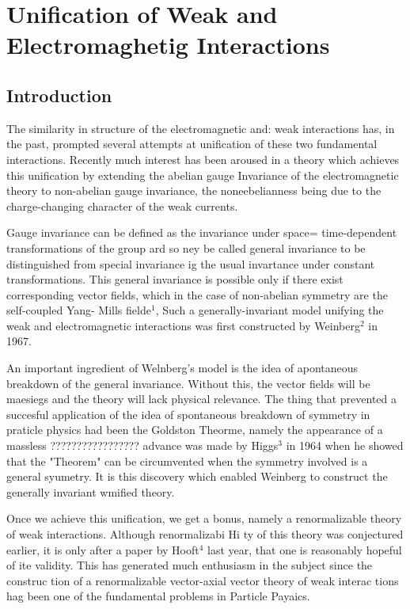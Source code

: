 \chapter[Unification of Weak and Electromaghetig Interactions]{Unification of Weak and Electromaghetig Interactions}\label{chap25}

\Authorline{}

\section{Introduction}

The similarity in structure of the electromagnetic and: weak
interactions has, in the past, prompted several attempts at unification
of these two fundamental interactions. Recently much interest has been
aroused in a theory which achieves this unification by extending the
abelian gauge Invariance of the electromagnetic theory to non-abelian
gauge invariance, the noneebelianness being due to the charge-changing
character of the weak currents. 

Gauge invariance can be defined as the invariance under space=
time-dependent transformations of the group ard so ney be called
general invariance to be distinguished from special invariance
ig the usual invartance under constant transformations. This general
invariance is possible only if there exist corresponding vector fields,
which in the case of non-abelian symmetry are the self-coupled Yang-
 Mills fielde$^{1}$, Such a generally-invariant model unifying the weak
and electromagnetic interactions was first constructed by Weinberg$^{2}$
in 1967. 

An important ingredient of Welnberg's model is the idea of
apontaneous breakdown of the general invariance. Without this, the
vector fields will be maesiegs and the theory will lack physical relevance. The thing that prevented a succesful application of the idea of spontaneous breakdown of symmetry in praticle physics had been the Goldston Theorme, namely the appearance of a massless ????????????????? advance was made by Higgs$^{3}$ in 1964 when he showed that the
"Theorem" can be circumvented when the symmetry involved is a general
syumetry. It is this discovery which enabled Weinberg to construct
the generally invariant wmified theory. 

Once we achieve this unification, we get a bonus, namely a
renormalizable theory of weak interactions. Although renormalizabi Hi ty
of this theory was conjectured earlier, it is only after a paper by
Hooft$^{4}$ last year, that one is reasonably hopeful of ite validity.
This has generated much enthusiasm in the subject since the construc
tion of a renormalizable vector-axial vector theory of weak interac
tions hag been one of the fundamental problems in Particle Payaics. 

